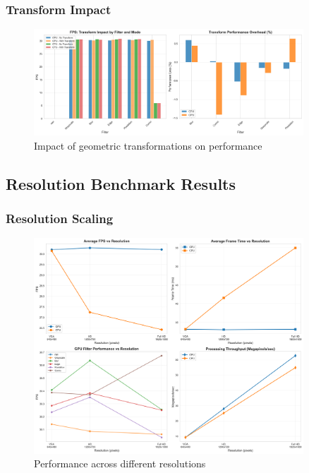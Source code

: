 \documentclass[12pt,a4paper]{article}
\begin{document}

\subsubsection{Transform Impact}
\begin{figure}[H]
    \centering
    \includegraphics[width=0.9\textwidth]{../data/plots/transform_comparison.png}
    \caption{Impact of geometric transformations on performance}
    \label{fig:transform_impact}
\end{figure}


\subsection{Resolution Benchmark Results}

\subsubsection{Resolution Scaling}
\begin{figure}[H]
    \centering
    \includegraphics[width=0.9\textwidth]{../data/plots/resolution_impact.png}
    \caption{Performance across different resolutions}
    \label{fig:resolution_impact}
\end{figure}
\end{document}
